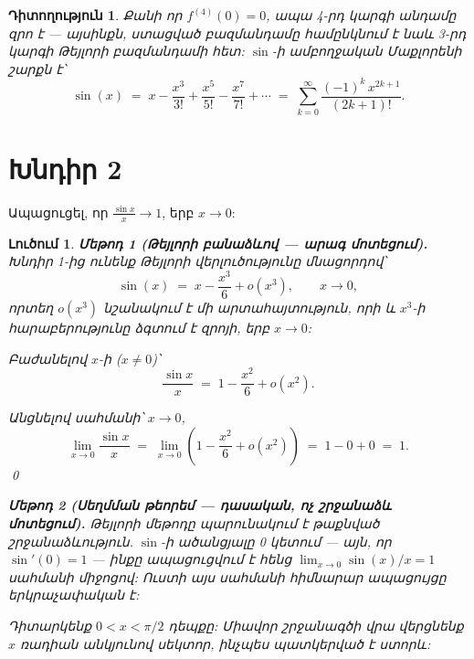 \documentclass[11pt,a4paper]{article}
\theoremstyle{solstyle}
\newtheorem*{solution}{Լուծում}
\newtheorem*{remark}{Դիտողություն}
\begin{document}
\begin{remark}
Քանի որ $f^{(4)}(0) = 0$, ապա 4-րդ կարգի անդամը զրո է --- այսինքն, ստացված բազմանդամը համընկնում է նաև 3-րդ կարգի Թեյլորի բազմանդամի հետ: $\sin$-ի ամբողջական Մաքլորենի շարքն է՝
\[
\sin(x) \;=\; x - \frac{x^3}{3!} + \frac{x^5}{5!} - \frac{x^7}{7!} + \cdots
\;=\; \sum_{k=0}^{\infty} \frac{(-1)^k\, x^{2k+1}}{(2k+1)!}.
\]
\end{remark}

\bigskip
\section*{Խնդիր 2}
Ապացուցել, որ $\displaystyle \frac{\sin x}{x} \to 1$, երբ $x \to 0$:

\begin{solution}

\noindent\textbf{Մեթոդ 1 (Թեյլորի բանաձևով --- արագ մոտեցում).}\quad
Խնդիր 1-ից ունենք Թեյլորի վերլուծությունը մնացորդով՝
\[
\sin(x) \;=\; x - \frac{x^3}{6} + o(x^3), \qquad x \to 0,
\]
որտեղ $o(x^3)$ նշանակում է մի արտահայտություն, որի և $x^3$-ի հարաբերությունը ձգտում է զրոյի, երբ $x \to 0$:

\medskip
Բաժանելով $x$-ի ($x \neq 0$)՝
\[
\frac{\sin x}{x} \;=\; 1 - \frac{x^2}{6} + o(x^2).
\]

\medskip
Անցնելով սահմանի՝ $x \to 0$,
\[
\lim_{x \to 0} \frac{\sin x}{x}
\;=\; \lim_{x \to 0} \left(1 - \frac{x^2}{6} + o(x^2)\right)
\;=\; 1 - 0 + 0 \;=\; 1.
\]
\qed

\bigskip
\noindent\textbf{Մեթոդ 2 (Սեղմման թեորեմ --- դասական, ոչ շրջանաձև մոտեցում).}\quad
Թեյլորի մեթոդը պարունակում է թաքնված շրջանաձևություն. $\sin$-ի ածանցյալը 0 կետում --- այն, որ $\sin'(0)=1$ --- ինքը ապացուցվում է հենց $\lim_{x \to 0}\sin(x)/x = 1$ սահմանի միջոցով: Ուստի այս սահմանի \emph{հիմնարար} ապացույցը երկրաչափական է:

\medskip
Դիտարկենք $0 < x < \pi/2$ դեպքը: Միավոր շրջանագծի վրա վերցնենք $x$ ռադիան անկյունով սեկտոր, ինչպես պատկերված է ստորև:

\begin{center}
\end{center}
\end{solution}
\end{document}
